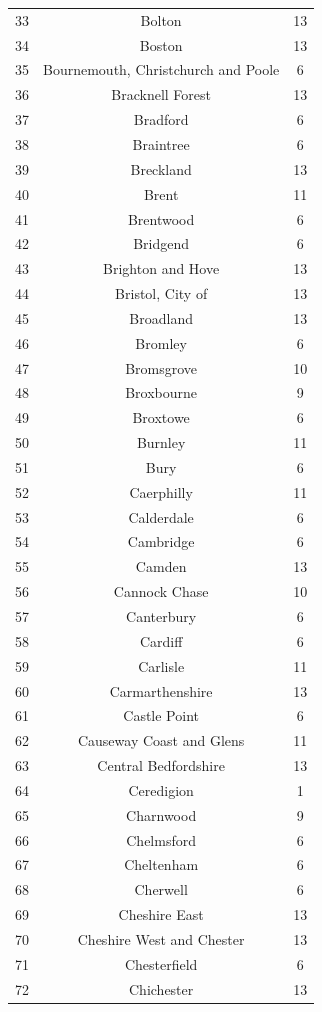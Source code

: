 \documentclass[Royal,times,sageh]{sagej}
\begin{document}
\begin{table}[!htbp]
\begin{tabular}{@{\extracolsep{5pt}} ccc}
33 & Bolton & 13 \\ 
34 & Boston & 13 \\ 
35 & Bournemouth, Christchurch and Poole & 6 \\ 
36 & Bracknell Forest & 13 \\ 
37 & Bradford & 6 \\ 
38 & Braintree & 6 \\ 
39 & Breckland & 13 \\ 
40 & Brent & 11 \\ 
41 & Brentwood & 6 \\ 
42 & Bridgend & 6 \\ 
43 & Brighton and Hove & 13 \\ 
44 & Bristol, City of & 13 \\ 
45 & Broadland & 13 \\ 
46 & Bromley & 6 \\ 
47 & Bromsgrove & 10 \\ 
48 & Broxbourne & 9 \\ 
49 & Broxtowe & 6 \\ 
50 & Burnley & 11 \\ 
51 & Bury & 6 \\ 
52 & Caerphilly & 11 \\ 
53 & Calderdale & 6 \\ 
54 & Cambridge & 6 \\ 
55 & Camden & 13 \\ 
56 & Cannock Chase & 10 \\ 
57 & Canterbury & 6 \\ 
58 & Cardiff & 6 \\ 
59 & Carlisle & 11 \\ 
60 & Carmarthenshire & 13 \\ 
61 & Castle Point & 6 \\ 
62 & Causeway Coast and Glens & 11 \\ 
63 & Central Bedfordshire & 13 \\ 
64 & Ceredigion & 1 \\ 
65 & Charnwood & 9 \\ 
66 & Chelmsford & 6 \\ 
67 & Cheltenham & 6 \\ 
68 & Cherwell & 6 \\ 
69 & Cheshire East & 13 \\ 
70 & Cheshire West and Chester & 13 \\ 
71 & Chesterfield & 6 \\ 
72 & Chichester & 13 \\ 

\end{tabular}
\end{table}
\end{document}
